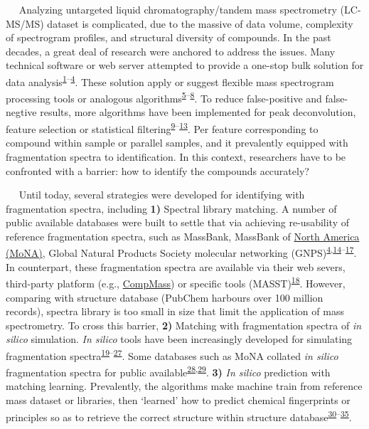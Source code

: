    Analyzing untargeted liquid chromatography/tandem mass spectrometry
(LC-MS/MS) dataset is complicated, due to the massive of data volume,
complexity of spectrogram profiles, and structural diversity of
compounds. In the past decades, a great deal of research were anchored
to address the issues. Many technical software or web server attempted
to provide a one-stop bulk solution for data
analysis\textsuperscript{\protect\hyperlink{ref-2020p}{1}--\protect\hyperlink{ref-2016a}{4}}.
These solution apply or suggest flexible mass spectrogram processing
tools or analogous
algorithms\textsuperscript{\protect\hyperlink{ref-2012d}{5}--\protect\hyperlink{ref-2010}{8}}.
To reduce false-positive and false-negtive results, more algorithms have
been implemented for peak deconvolution, feature selection or
statistical
filtering\textsuperscript{\protect\hyperlink{ref-2017f}{9}--\protect\hyperlink{ref-2017i}{13}}.
Per feature corresponding to compound within sample or parallel samples,
and it prevalently equipped with fragmentation spectra to
identification. In this context, researchers have to be confronted with
a barrier: how to identify the compounds accurately?

   Until today, several strategies were developed for identifying with
fragmentation spectra, including \textbf{1)} Spectral library matching.
A number of public available databases were built to settle that via
achieving re-usability of reference fragmentation spectra, such as
MassBank, MassBank of \href{https://mona.fiehnlab.ucdavis.edu/}{North
America (MoNA)}, Global Natural Products Society molecular networking
(GNPS)\textsuperscript{\protect\hyperlink{ref-2016a}{4},\protect\hyperlink{ref-2010p}{14}--\protect\hyperlink{ref-2020cp}{17}}.
In counterpart, these fragmentation spectra are available via their web
severs, third-party platform (e.g.,
\href{http://prime.psc.riken.jp/compms/msdial/main.html\#MSP\%3E}{CompMass})
or specific tools
(MASST)\textsuperscript{\protect\hyperlink{ref-2020cm}{18}}. However,
comparing with structure database (PubChem harbours over 100 million
records), spectra library is too small in size that limit the
application of mass spectrometry. To cross this barrier, \textbf{2)}
Matching with fragmentation spectra of \emph{in silico} simulation.
\emph{In silico} tools have been increasingly developed for simulating
fragmentation
spectra\textsuperscript{\protect\hyperlink{ref-2010c}{19}--\protect\hyperlink{ref-2020cn}{27}}.
Some databases such as MoNA collated \emph{in silico} fragmentation
spectra for public
available\textsuperscript{\protect\hyperlink{ref-2013w}{28},\protect\hyperlink{ref-2015aj}{29}}.
\textbf{3)} \emph{In silico} prediction with matching learning.
Prevalently, the algorithms make machine train from reference mass
dataset or libraries, then `learned' how to predict chemical
fingerprints or principles so as to retrieve the correct structure
within structure
database\textsuperscript{\protect\hyperlink{ref-2012ab}{30}--\protect\hyperlink{ref-2021cy}{35}}.

